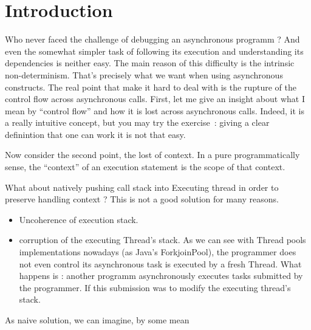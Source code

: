 
\chapter{Introduction}


Who never faced the challenge of debugging an asynchronous programm ? And even the somewhat simpler task of following its execution and understanding its dependencies is neither easy.
The main reason of this difficulty is the intrinsic non-determinism. That's precisely what we want when using asynchronous constructs. The real point that make it hard to deal with is the rupture of the control flow across asynchronous calls.
First, let me give an insight about what I mean by ``control flow'' and how it is lost across asynchronous calls. Indeed, it is a really intuitive concept, but you may try the exercise~: giving a clear definintion that one can work it is not that easy.

Now consider the second point, the lost of context. In a pure programmatically sense, the ``context'' of an execution statement is the scope of that context. 


What about natively pushing call stack into Executing thread in order to preserve handling context ? This is not a good solution for many reasons.
\begin{itemize}
\item Uncoherence of execution stack. 
\item corruption of the executing Thread's stack. As we can see with Thread pools implementations nowadays (as Java's ForkjoinPool), the programmer does not even control its asynchronous task is executed by a fresh Thread. What happens is : another programm asynchronously executes tasks submitted by the programmer. If this submission was to modify the executing thread's stack.
\end{itemize}
As naive solution, we can imagine, by some mean 